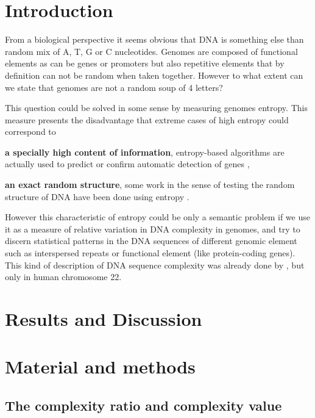 
\section{Introduction}

From a biological perspective it seems obvious that DNA is something else than random mix of A, T, G or C nucleotides. Genomes are composed of functional elements as can be genes or promoters but also repetitive elements that by definition can not be random when taken together. However to what extent can we state that genomes are not a random soup of 4 letters? 

This question could be solved in some sense by measuring genomes entropy. This measure presents the disadvantage that extreme cases of high entropy could correspond to \begin{inparaenum} \item {\bf a specially high content of information}, entropy-based algorithms are actually used to predict or confirm automatic detection of genes \cite{Du2006,Gerstein2007}, \item {\bf an exact random structure}, some work in the sense of testing the random structure of DNA have been done using entropy \cite{Loewenstern1999}. \end{inparaenum} However this characteristic of entropy could be only a semantic problem if we use it as a measure of relative variation in DNA complexity in genomes, and try to discern statistical patterns in the DNA sequences of different genomic element such as interspersed repeats or functional element (like protein-coding genes). This kind of description of DNA sequence complexity was already done by \cite{Holste2001}, but only in human chromosome 22.



\section{Results and Discussion}
\section{Material and methods}

\subsection{The complexity ratio and complexity value}

